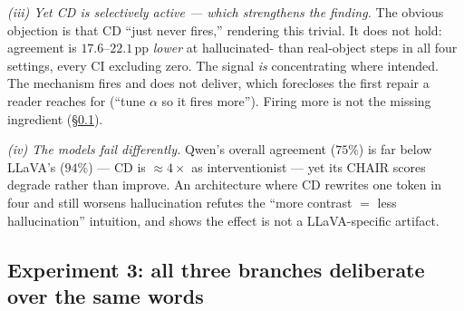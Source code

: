 \documentclass{article}
\begin{document}
\emph{(iii) Yet CD is selectively active --- which strengthens the finding.} The
obvious objection is that CD ``just never fires,'' rendering this trivial. It
does not hold: agreement is $17.6$--$22.1$\,pp \emph{lower} at hallucinated-
than real-object steps in all four settings, every CI excluding zero. The
signal \emph{is} concentrating where intended. The mechanism fires and does not
deliver, which forecloses the first repair a reader reaches for (``tune
$\alpha$ so it fires more''). Firing more is not the missing ingredient
(\S\ref{subsec:cdmech-res-overlap}).

\emph{(iv) The models fail differently.} Qwen's overall agreement ($75\%$) is
far below LLaVA's ($94\%$) --- CD is ${\approx}4\times$ as interventionist ---
yet its CHAIR scores degrade rather than improve. An architecture where CD
rewrites one token in four and still worsens hallucination refutes the ``more
contrast $=$ less hallucination'' intuition, and shows the effect is not a
LLaVA-specific artifact.

\subsection{Experiment 3: all three branches deliberate over the same words}
\label{subsec:cdmech-res-overlap}
\end{document}
